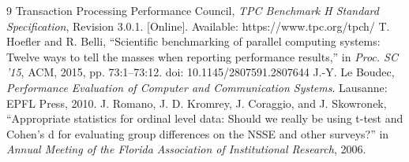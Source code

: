 \documentclass[11pt,a4paper]{article}
\begin{document}
\begin{thebibliography}{9}
\footnotesize\setlength{\itemsep}{0pt}\setlength{\parsep}{0pt}
 Transaction Processing Performance Council, \emph{TPC Benchmark H Standard Specification}, Revision 3.0.1. [Online]. Available: https://www.tpc.org/tpch/
 T. Hoefler and R. Belli, ``Scientific benchmarking of parallel computing systems: Twelve ways to tell the masses when reporting performance results,'' in \emph{Proc. SC '15}, ACM, 2015, pp. 73:1--73:12. doi: 10.1145/2807591.2807644
 J.-Y. Le Boudec, \emph{Performance Evaluation of Computer and Communication Systems}. Lausanne: EPFL Press, 2010.
 J. Romano, J. D. Kromrey, J. Coraggio, and J. Skowronek, ``Appropriate statistics for ordinal level data: Should we really be using t-test and Cohen's d for evaluating group differences on the NSSE and other surveys?'' in \emph{Annual Meeting of the Florida Association of Institutional Research}, 2006.
\end{thebibliography}
\end{document}
